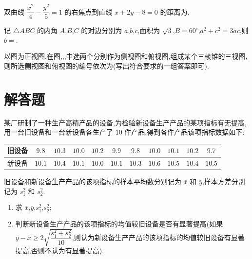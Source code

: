 \begin{problem}
双曲线 \(\dfrac{x^2}{4}-\dfrac{y^2}{5}=1\) 的右焦点到直线 \(x+2y-8=0\) 的距离为\fillinblank{}.
\end{problem}

\begin{problem}
记 \(\triangle ABC\) 的内角 \(A\),\(B\),\(C\) 的对边分别为 \(a\),\(b\),\(c\),面积为 \(\sqrt3\),\(B=60^\circ\),\(a^2+c^2=3ac\),则 \(b=\)\fillinblank{}.
\end{problem}

\begin{problem}
以图为正视图,在图,,,中选两个分别作为侧视图和俯视图,组成某个三棱锥的三视图,则所选侧视图和俯视图的编号依次为\fillinblank{}(写出符合要求的一组答案即可).

\end{problem}

\section{解答题}

\begin{problem}
某厂研制了一种生产高精产品的设备,为检验新设备生产产品的某项指标有无提高,用一台旧设备和一台新设备各生产了 \(10\) 件产品,得到各件产品该项指标数据如下:

\begin{center}
\begin{tabular}{|c|*{10}{c|}}
\hline
旧设备 & \(9.8\) & \(10.3\) & \(10.0\) & \(10.2\) & \(9.9\) & \(9.8\) & \(10.0\) & \(10.1\) & \(10.2\) & \(9.7\) \\
\hline
新设备 & \(10.1\) & \(10.4\) & \(10.1\) & \(10.0\) & \(10.1\) & \(10.3\) & \(10.6\) & \(10.5\) & \(10.4\) & \(10.5\) \\
\hline
\end{tabular}
\end{center}

旧设备和新设备生产产品的该项指标的样本平均数分别记为 \(\bar{x}\) 和 \(\bar{y}\),样本方差分别记为 \(s_1^2\) 和 \(s_2^2\).

\begin{enumerate}
\item 求 \(\bar{x}\),\(\bar{y}\),\(s_1^2\),\(s_2^2\);
\item 判断新设备生产产品的该项指标的均值较旧设备是否有显著提高(如果 \(\bar{y}-\bar{x}\ge2\sqrt{\dfrac{s_1^2+s_2^2}{10}}\),则认为新设备生产产品的该项指标的均值较旧设备有显著提高,否则不认为有显著提高).
\end{enumerate}
\end{problem}

